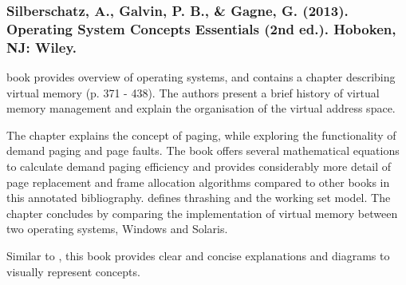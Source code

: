\subsubsection*{Silberschatz, A., Galvin, P. B., \& Gagne, G. (2013). Operating System Concepts Essentials (2nd ed.). Hoboken, NJ: Wiley.}

 book provides overview of operating systems, and contains a chapter describing virtual memory (p. 371 - 438). The authors present a brief history of virtual memory management and explain the organisation of the virtual address space.

The chapter explains the concept of paging, while exploring the functionality of demand paging and page faults. The book offers several mathematical equations to calculate demand paging efficiency and provides considerably more detail of page replacement and frame allocation algorithms compared to other books in this annotated bibliography. \citet{Silberschatz2013} defines thrashing and the working set model. The chapter concludes by comparing the implementation of virtual memory between two operating systems, Windows and Solaris.

Similar to \citet{Jacob2008}, this book provides clear and concise explanations and diagrams to visually represent concepts.